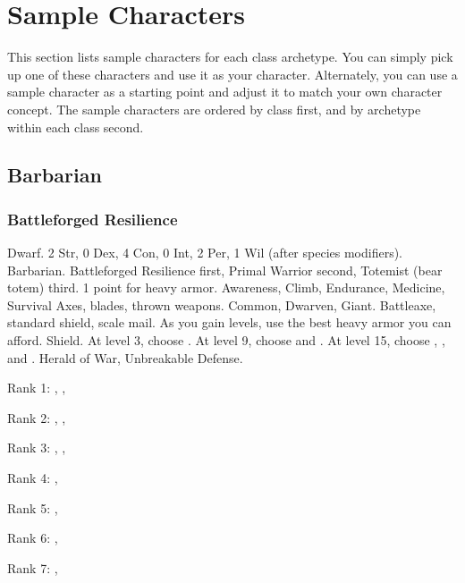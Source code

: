\section{Sample Characters}

    This section lists sample characters for each class archetype.
    You can simply pick up one of these characters and use it as your character.
    Alternately, you can use a sample character as a starting point and adjust it to match your own character concept.
    The sample characters are ordered by class first, and by archetype within each class second.

    \subsection{Barbarian}

        \subsubsection{Battleforged Resilience}
             Dwarf.
             2 Str, 0 Dex, 4 Con, 0 Int, 2 Per, 1 Wil (after species modifiers).
             Barbarian.
             Battleforged Resilience first, Primal Warrior second, Totemist (bear totem) third.
             1 point for heavy armor.
             Awareness, Climb, Endurance, Medicine, Survival
             Axes, blades, thrown weapons.
             Common, Dwarven, Giant.
             Battleaxe, standard shield, scale mail. As you gain levels, use the best heavy armor you can afford.
             Shield.
                At level 3, choose .
                At level 9, choose  and .
                At level 15, choose , , and .
             Herald of War, Unbreakable Defense.
            \begin{raggeditemize}
                \item Rank 1: , , 
                \item Rank 2: , , 
                \item Rank 3: , , 
                \item Rank 4: , 
                \item Rank 5: , 
                \item Rank 6: , 
                \item Rank 7: , 
            \end{raggeditemize}
